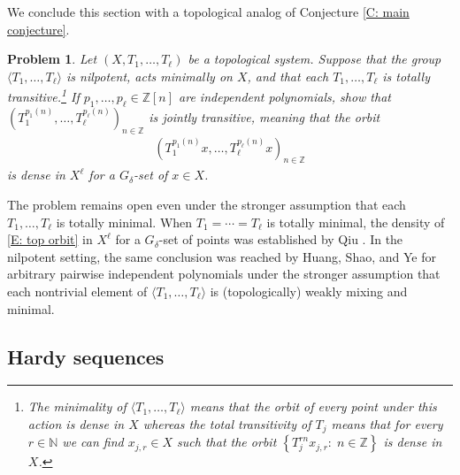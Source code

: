 \documentclass[11pt]{amsart}
\newtheorem{problem}{Problem}
\theoremstyle{definition}
\newcommand{\N}{{\mathbb N}}
\newcommand{\Z}{{\mathbb Z}}
\newcommand{\1}{{\mathbf{1}}}
\newcommand{\rem}[1]{\left \{ #1 \right \}}
\begin{document}
We conclude this section with a topological analog of Conjecture \ref{C: main conjecture}.
\begin{problem}\label{Pr: joint transitivity}
    Let $(X, T_1, \ldots, T_\ell)$ be a topological system. Suppose that the group $\langle T_1, \ldots, T_\ell\rangle$ is nilpotent, acts minimally on $X$, and that each $T_1, \ldots, T_\ell$ is totally transitive.\footnote{The \textit{minimality} of $\langle T_1, \ldots, T_\ell\rangle$ means that the orbit of every point under this action is dense in $X$ whereas the \textit{total transitivity} of $T_j$ means that for every $r\in\N$ we can find $x_{j,r}\in X$ such that the orbit $\rem{T_j^{rn}x_{j,r}\colon\; n\in\Z}$ is dense in $X$.} If $p_1, \ldots, p_\ell\in\Z[n]$ are independent polynomials, show that {$(T_1^{p_1(n)}, \ldots, T_\ell^{p_\ell(n)})_{n\in\Z}$ is \emph{jointly transitive}, meaning that} the orbit
    \begin{align}\label{E: top orbit}
        (T_1^{p_1(n)}x, \ldots, T_\ell^{p_\ell(n)}x)_{n\in\Z}
    \end{align}
    is dense in $X^\ell$ for a $G_\delta$-set of $x\in X$.
\end{problem}

The problem remains open even under the stronger assumption that each $T_1, \ldots, T_\ell$ is totally minimal. When $T_1 = \cdots = T_\ell$ is totally minimal, the density of \eqref{E: top orbit} in $X^\ell$ for a $G_\delta$-set of points was established by Qiu \cite{Qiu23}. In the nilpotent setting, the same conclusion was reached  by Huang, Shao, and Ye \cite{HSY19} for arbitrary pairwise independent polynomials under the stronger assumption that each nontrivial element of $\langle T_1, \ldots, T_\ell\rangle$ is (topologically) weakly mixing and minimal.

\subsection{Hardy sequences}\label{SS: Hardy}
\end{document}
